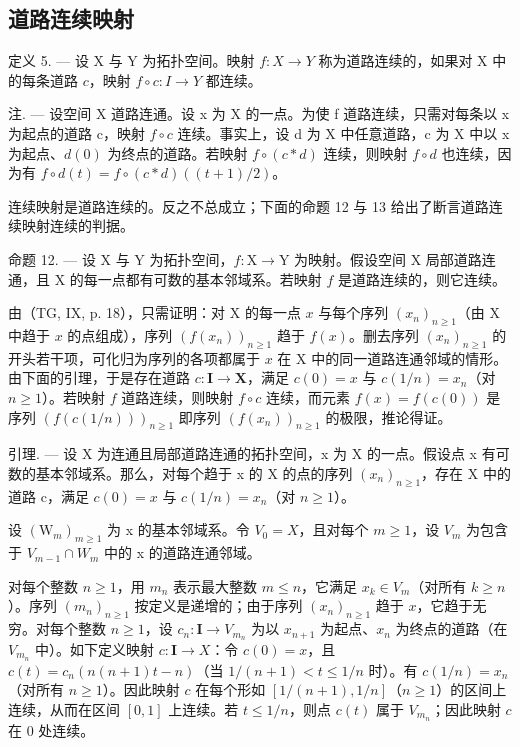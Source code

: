 \subsection{道路连续映射}

定义 5. --- 设 X 与 Y 为拓扑空间。映射 \(f: X \to Y\) 称为道路连续的，如果对 X 中的每条道路 \(c\)，映射 \(f \circ c: I \to Y\) 都连续。

注. --- 设空间 X 道路连通。设 x 为 X 的一点。为使 f 道路连续，只需对每条以 x 为起点的道路 c，映射 \(f \circ c\) 连续。事实上，设 d 为 X 中任意道路，c 为 X 中以 x 为起点、\(d(0)\) 为终点的道路。若映射 \(f \circ (c * d)\) 连续，则映射 \(f \circ d\) 也连续，因为有 \(f \circ d(t) = f \circ (c * d)((t + 1)/2)\)。

连续映射是道路连续的。反之不总成立；下面的命题 12 与 13 给出了断言道路连续映射连续的判据。

命题 12. --- 设 X 与 Y 为拓扑空间，\(f: \mathrm{X} \to \mathrm{Y}\) 为映射。假设空间 X 局部道路连通，且 X 的每一点都有可数的基本邻域系。若映射 \(f\) 是道路连续的，则它连续。

由（TG, IX, p. 18），只需证明：对 X 的每一点 \(x\) 与每个序列 \((x_n)_{n \geqslant 1}\)（由 X 中趋于 \(x\) 的点组成），序列 \((f(x_n))_{n \geqslant 1}\) 趋于 \(f(x)\)。删去序列 \((x_n)_{n \geqslant 1}\) 的开头若干项，可化归为序列的各项都属于 \(x\) 在 X 中的同一道路连通邻域的情形。由下面的引理，于是存在道路 \(c: \mathbf{I} \to \mathbf{X}\)，满足 \(c(0) = x\) 与 \(c(1/n) = x_n\)（对 \(n \geqslant 1\)）。若映射 \(f\) 道路连续，则映射 \(f \circ c\) 连续，而元素 \(f(x) = f(c(0))\) 是序列 \((f(c(1/n)))_{n \geqslant 1}\) 即序列 \((f(x_n))_{n \geqslant 1}\) 的极限，推论得证。

引理. --- 设 X 为连通且局部道路连通的拓扑空间，x 为 X 的一点。假设点 x 有可数的基本邻域系。那么，对每个趋于 x 的 X 的点的序列 \((x_{n})_{n\geqslant1}\)，存在 X 中的道路 c，满足 \(c(0)=x\) 与 \(c(1/n)=x_{n}\)（对 \(n\geqslant1\)）。

设 \((\mathrm{W}_{m})_{m\geqslant1}\) 为 x 的基本邻域系。令 \(V_{0}=X\)，且对每个 \(m\geqslant1\)，设 \(V_{m}\) 为包含于 \(V_{m-1}\cap W_{m}\) 中的 x 的道路连通邻域。

对每个整数 \(n \geqslant 1\)，用 \(m_n\) 表示最大整数 \(m \leqslant n\)，它满足 \(x_k \in V_m\)（对所有 \(k \geqslant n\)）。序列 \((m_n)_{n \geqslant 1}\) 按定义是递增的；由于序列 \((x_n)_{n \geqslant 1}\) 趋于 \(x\)，它趋于无穷。对每个整数 \(n \geqslant 1\)，设 \(c_n: \mathbf{I} \to V_{m_n}\) 为以 \(x_{n+1}\) 为起点、\(x_n\) 为终点的道路（在 \(V_{m_n}\) 中）。如下定义映射 \(c: \mathbf{I} \to X\)：令 \(c(0) = x\)，且 \(c(t) = c_n(n(n+1)t - n)\)（当 \(1/(n+1) < t \leqslant 1/n\) 时）。有 \(c(1/n) = x_n\)（对所有 \(n \geqslant 1\)）。因此映射 \(c\) 在每个形如 \([1/(n+1), 1/n]\)（\(n \geqslant 1\)）的区间上连续，从而在区间 \([0,1]\) 上连续。若 \(t \leqslant 1/n\)，则点 \(c(t)\) 属于 \(V_{m_n}\)；因此映射 \(c\) 在 0 处连续。

